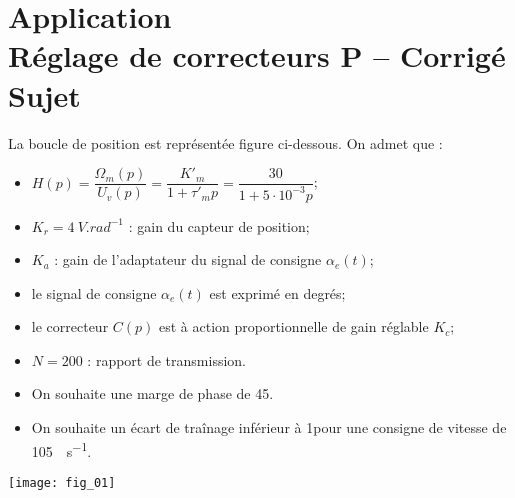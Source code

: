 \chapter*{Application  \\ 
Réglage de correcteurs P -- 
\ifprof Corrigé \else Sujet \fi}

\iflivret {} \else
\ifprof  {} \else \fi
\fi

\setcounter{question}{0}


La boucle de position est représentée figure ci-dessous. On admet que : 
\begin{itemize}
\item $H(p)=\dfrac{\Omega_m(p)}{U_v(p)}=\dfrac{K'_m}{1+\tau'_m p}=\dfrac{30}{1+5\cdot 10^{-3} p}$;
\item $K_r = \SI{4}{V.rad^{-1}}$ : gain du capteur de position;
\item $K_a$ : gain de l'adaptateur du signal de consigne $\alpha_e(t)$;
\item le signal de consigne $\alpha_e(t)$ est exprimé en degrés;
\item le correcteur $C(p)$ est à action proportionnelle de gain réglable $K_c$;
\item $N=200$ : rapport de transmission.
\end{itemize}

\begin{obj}
\begin{itemize}
\item On souhaite une marge de phase de 45\degres.
\item On souhaite un écart de traînage inférieur à 1\degres pour une consigne de vitesse de \SI{105}{\degres.s^{-1}}. 
\end{itemize}
\end{obj}

\begin{center}
\texttt{[image: fig\_01]}
\end{center}

\ifprof
\begin{corrige}

\end{corrige}
\else
\fi


